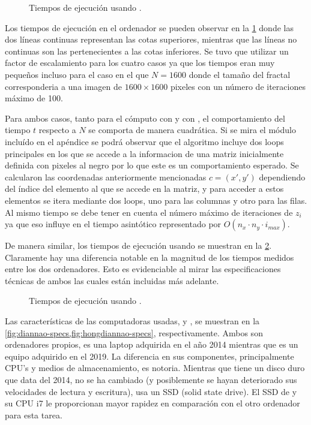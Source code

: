 \begin{figure}[ht!]
    \centering
    
    \caption{Tiempos de ejecución usando {\diannao}.}
    \label{fig:times-diannao}
\end{figure}

Los tiempos de ejecución en el ordenador {\diannao} se pueden observar en la \cref{fig:times-diannao} donde las dos líneas continuas representan las cotas superiores, mientras que las líneas no continuas son las pertenecientes a las cotas inferiores. Se tuvo que utilizar un factor de escalamiento para los cuatro casos ya que los tiempos eran muy pequeños incluso para el caso en el que $N = 1600$ donde el tamaño del fractal corresponderia a una imagen de $1600 \times 1600$ pixeles con un número de iteraciones máximo de 100.

Para ambos casos, tanto para el cómputo con {\diannao} y con {\hongdiannao}, el comportamiento del tiempo $t$ respecto a $N$ se comporta de manera cuadrática. Si se mira el módulo incluído en el apéndice se podrá observar que el algoritmo incluye dos  loops principales en los que se accede a la informacion de una matriz inicialmente definida con pixeles al negro  por lo que este es un comportamiento esperado. Se calcularon las coordenadas anteriormente mencionadas $c = (x', y')$ dependiendo del índice del elemento al que se accede en la matriz, y para acceder a estos elementos se itera mediante dos  loops, uno para las columnas y otro para las filas. Al mismo tiempo se debe tener en cuenta el número máximo de iteraciones de $z_i$ ya que eso influye en el tiempo asintótico representado por $O(n_x \cdot n_y \cdot i_{max})$.

De manera similar, los tiempos de ejecución usando {\hongdiannao} se muestran en la \cref{fig:times-hongdiannao}. Claramente hay una diferencia notable en la magnitud de los tiempos medidos entre los dos ordenadores. Esto es evidenciable al mirar las especificaciones técnicas de ambos las cuales están incluidas más adelante.
\begin{figure}[ht!]
    \centering
    
    \caption{Tiempos de ejecución usando {\hongdiannao}.}
    \label{fig:times-hongdiannao}
\end{figure}
Las características de las computadoras usadas, {\diannao} y {\hongdiannao}, se muestran en la \cref{fig:diannao-specs,fig:hongdiannao-specs}, respectivamente. Ambos son ordenadores propios, {\hongdiannao} es una laptop adquirida en el año 2014 mientras que {\diannao} es un equipo adquirido en el 2019. La diferencia en sus componentes, principalmente CPU's y medios de almacenamiento, es notoria. Mientras que {\hongdiannao} tiene un disco duro que data del 2014, no se ha cambiado (y posiblemente se hayan deteriorado sus velocidades de lectura y escritura), {\diannao} usa un SSD (solid state drive). El SSD de {\diannao} y su CPU i7 le proporcionan mayor rapidez en comparación con el otro ordenador para esta tarea.


